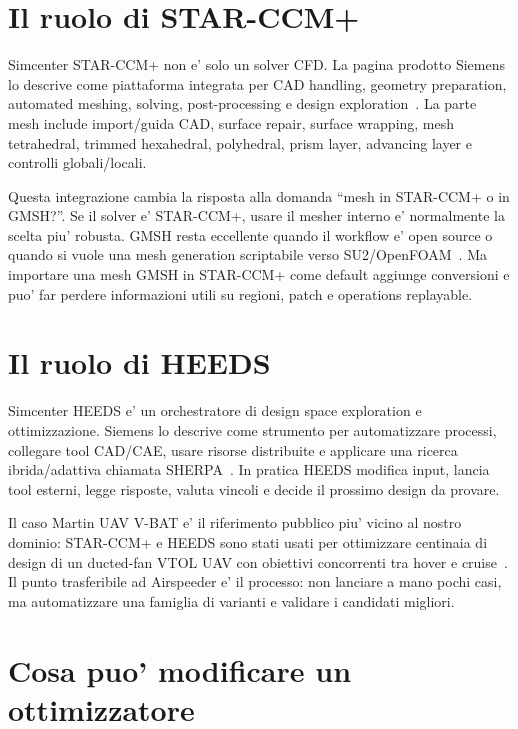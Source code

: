 \section{Il ruolo di STAR-CCM+}

Simcenter STAR-CCM+ non e' solo un solver CFD. La pagina prodotto Siemens lo descrive come piattaforma integrata per CAD handling, geometry preparation, automated meshing, solving, post-processing e design exploration~\cite{starccm_official}. La parte mesh include import/guida CAD, surface repair, surface wrapping, mesh tetrahedral, trimmed hexahedral, polyhedral, prism layer, advancing layer e controlli globali/locali.

Questa integrazione cambia la risposta alla domanda ``mesh in STAR-CCM+ o in GMSH?''. Se il solver e' STAR-CCM+, usare il mesher interno e' normalmente la scelta piu' robusta. GMSH resta eccellente quando il workflow e' open source o quando si vuole una mesh generation scriptabile verso SU2/OpenFOAM~\cite{gmsh_official,su2_tutorials}. Ma importare una mesh GMSH in STAR-CCM+ come default aggiunge conversioni e puo' far perdere informazioni utili su regioni, patch e operations replayable.

\section{Il ruolo di HEEDS}

Simcenter HEEDS e' un orchestratore di design space exploration e ottimizzazione. Siemens lo descrive come strumento per automatizzare processi, collegare tool CAD/CAE, usare risorse distribuite e applicare una ricerca ibrida/adattiva chiamata SHERPA~\cite{heeds_official,simcenter_dse}. In pratica HEEDS modifica input, lancia tool esterni, legge risposte, valuta vincoli e decide il prossimo design da provare.

Il caso Martin UAV V-BAT e' il riferimento pubblico piu' vicino al nostro dominio: STAR-CCM+ e HEEDS sono stati usati per ottimizzare centinaia di design di un ducted-fan VTOL UAV con obiettivi concorrenti tra hover e cruise~\cite{martin_uav_siemens}. Il punto trasferibile ad Airspeeder e' il processo: non lanciare a mano pochi casi, ma automatizzare una famiglia di varianti e validare i candidati migliori.

\section{Cosa puo' modificare un ottimizzatore}


